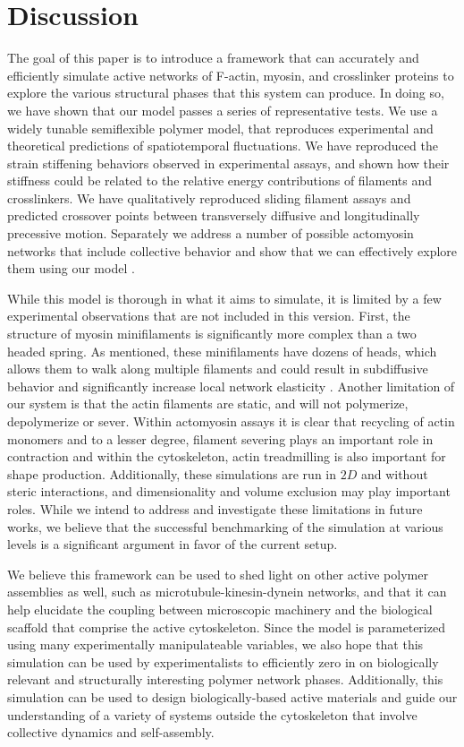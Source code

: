 \documentclass[12pt]{article}
\begin{document}
\section{Discussion}
The goal of this paper is to introduce a framework that can accurately and efficiently simulate active networks of F-actin,
myosin, and crosslinker proteins to explore the various structural phases that this system can produce. In doing so, we
have shown that our model passes a series of representative tests. We use a widely tunable semiflexible polymer model, that
reproduces experimental and theoretical predictions of spatiotemporal fluctuations. We have reproduced the strain stiffening
behaviors observed in experimental assays, and shown how their stiffness could be related to the relative energy
contributions of filaments and crosslinkers. We have qualitatively reproduced sliding filament assays and predicted
crossover points between transversely diffusive and longitudinally precessive motion. 
Separately we address a number of possible actomyosin networks that include collective behavior 
and show that we can effectively explore them using our model \cite{freedman2016,stam2016}.
\par
While this model is thorough in what it aims to simulate, it is limited by a few experimental observations that are
not included in this version. First, the structure of myosin minifilaments is significantly more complex than a two headed
spring. As mentioned, these minifilaments have dozens of heads, which allows them to walk along multiple filaments and
could result in subdiffusive behavior \cite{scholz2016} and significantly increase local network elasticity
\cite{murrellTalk}.
Another limitation of our system is that the actin filaments are static, and will not polymerize, depolymerize or
sever. Within actomyosin assays it is clear that recycling of actin monomers and to a lesser degree, filament severing 
plays an important role in contraction and within the cytoskeleton, actin treadmilling is also important
for shape production\cite{wilson2010,murrell2012}. Additionally, these simulations are run in $2D$ and without steric interactions, and
dimensionality and volume exclusion may play important roles. While we intend to address and investigate these limitations in future
works, we believe that the successful benchmarking of the simulation at various levels is a significant argument in favor of the
current setup.
\par 
We believe this framework can be used to shed light on other active polymer assemblies as well,
such as microtubule-kinesin-dynein networks, and that it can help 
elucidate the coupling between microscopic machinery and the biological scaffold 
that comprise the active cytoskeleton. Since the model is parameterized using many 
experimentally manipulateable variables, we also hope that this simulation can be used
by experimentalists to efficiently zero in on biologically relevant and structurally interesting
polymer network phases. 
Additionally, this simulation can be used to design biologically-based active
materials and guide our understanding of a variety of systems outside the 
cytoskeleton that involve collective dynamics and self-assembly.
\end{document}
